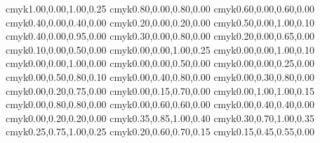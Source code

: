 \definecolor{verydarkgreen}       {cmyk}{1.00,0.00,1.00,0.25}
\definecolor{darkgreen}           {cmyk}{0.80,0.00,0.80,0.00}
\definecolor{green}               {cmyk}{0.60,0.00,0.60,0.00}
\definecolor{lightgreen}          {cmyk}{0.40,0.00,0.40,0.00}
\definecolor{verylightgreen}      {cmyk}{0.20,0.00,0.20,0.00}
\definecolor{verydarklimegreen}   {cmyk}{0.50,0.00,1.00,0.10}
\definecolor{darklimegreen}       {cmyk}{0.40,0.00,0.95,0.00}
\definecolor{limegreen}           {cmyk}{0.30,0.00,0.80,0.00}
\definecolor{lightlimegreen}      {cmyk}{0.20,0.00,0.65,0.00}
\definecolor{verylightlimegreen}  {cmyk}{0.10,0.00,0.50,0.00}
\definecolor{verydarkyellow}      {cmyk}{0.00,0.00,1.00,0.25}
\definecolor{darkyellow}          {cmyk}{0.00,0.00,1.00,0.10}
\definecolor{yellow}              {cmyk}{0.00,0.00,1.00,0.00}
\definecolor{lightyellow}         {cmyk}{0.00,0.00,0.50,0.00}
\definecolor{verylightyellow}     {cmyk}{0.00,0.00,0.25,0.00}
\definecolor{verydarkorange}      {cmyk}{0.00,0.50,0.80,0.10}
\definecolor{darkorange}          {cmyk}{0.00,0.40,0.80,0.00}
\definecolor{orange}              {cmyk}{0.00,0.30,0.80,0.00}
\definecolor{lightorange}         {cmyk}{0.00,0.20,0.75,0.00}
\definecolor{verylightorange}     {cmyk}{0.00,0.15,0.70,0.00}
\definecolor{verydarkred}         {cmyk}{0.00,1.00,1.00,0.15}
\definecolor{darkred}             {cmyk}{0.00,0.80,0.80,0.00}
\definecolor{red}                 {cmyk}{0.00,0.60,0.60,0.00}
\definecolor{lightred}            {cmyk}{0.00,0.40,0.40,0.00}
\definecolor{verylightred}        {cmyk}{0.00,0.20,0.20,0.00}
\definecolor{verydarkbrown}       {cmyk}{0.35,0.85,1.00,0.40}
\definecolor{darkbrown}           {cmyk}{0.30,0.70,1.00,0.35}
\definecolor{brown}               {cmyk}{0.25,0.75,1.00,0.25}
\definecolor{lightbrown}          {cmyk}{0.20,0.60,0.70,0.15}
\definecolor{verylightbrown}      {cmyk}{0.15,0.45,0.55,0.00}
